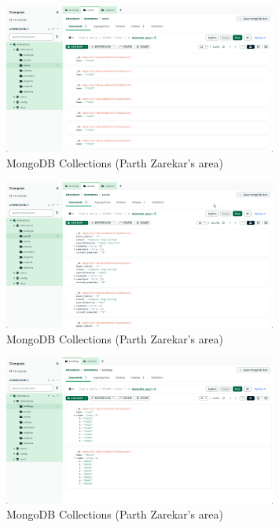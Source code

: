 \documentclass[openany]{report}
\begin{document}
\begin{figure}[H]
    \centering
    \includegraphics[width=0.8\textwidth]{../imgs/Mongo 1.png}
    \caption{MongoDB Collections (Parth Zarekar’s area)}
    \label{fig:parth_mongodb}
\end{figure}
\begin{figure}[H]
    \centering
    \includegraphics[width=0.8\textwidth]{../imgs/Mongo 2.png}
    \caption{MongoDB Collections (Parth Zarekar’s area)}
    \label{fig:parth_mongodb}
\end{figure}

\begin{figure}[H]
    \centering
    \includegraphics[width=0.8\textwidth]{../imgs/Mongo 3.png}
    \caption{MongoDB Collections (Parth Zarekar’s area)}
    \label{fig:parth_mongodb}
\end{figure}
\end{document}

